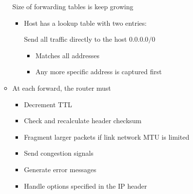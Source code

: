 \begin{itemize}
\begin{itemize}
            \icon Size of forwarding tables is keep growing
                \begin{itemize}
                    \item Host has a lookup table with two entries:
                        \begin{itemize}
                             Send all traffic directly to the host
                             $0.0.0.0/0$
                                \begin{itemize}
                                    \item Matches all addresses
                                    \item Any more specific address is captured first
                                \end{itemize}
                        \end{itemize}
                \end{itemize}
            \item At each forward, the router must
                \begin{itemize}
                    \item Decrement TTL
                    \item Check and recalculate header checksum
                    \item Fragment larger packets if link network MTU is limited
                    \item Send congestion signals
                    \item Generate error messages
                    \item Handle options specified in the IP header
                \end{itemize}
        \end{itemize}
\end{itemize}

